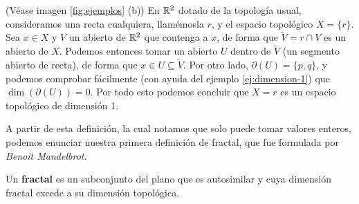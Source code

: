 \begin{ejemplo}
(Véase imagen \ref{fig:ejemplos} (b))
En $\mathbb{R}^2$ dotado de la topología usual, consideramos una recta cualquiera, llamémosla $r$, y el espacio topológico $X=\{r\}$. Sea $x\in X$ y $V$ un abierto de $\mathbb{R}^2$ que contenga a $x$, de forma que $\tilde{V} = r\cap V$ es un abierto de $X$. Podemos entonces tomar un abierto $U$ dentro de $\tilde{V}$ (un segmento abierto de recta), de forma que $x\in U\subseteq \tilde{V}$. Por otro lado, $\partial(U)=\{p,q\}$, y podemos comprobar fácilmente (con ayuda del ejemplo \ref{ej:dimension-1}) que $\dim(\partial(U))=0$. Por todo esto podemos concluir que $X=r$ es un espacio topológico de dimensión 1. 
\end{ejemplo}

A partir de esta definición, la cual notamos que solo puede tomar valores enteros, podemos enunciar nuestra primera definición de fractal, que fue formulada por \textit{Benoit Mandelbrot}.

\begin{definicion}[Fractal]
\label{def:fractal}
Un \textbf{fractal} es un subconjunto del plano que es autosimilar y cuya dimensión fractal excede a su dimensión topológica.
\end{definicion}
